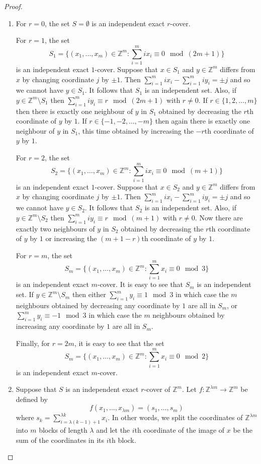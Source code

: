 \documentclass[12pt,a4paper]{article}
\newcommand{\Z}{\mathbb Z}
\begin{document}
\begin{proof}
\begin{enumerate}
\item For $r=0$, the set $S=\emptyset$ is an independent exact $r$-cover.

For $r=1$, the set 
\[
S_1=\{(x_1,\ldots,x_m)\in\Z^m : \sum_{i=1}^m ix_i\equiv 0 \mod (2m+1)\}
\]
is an independent exact $1$-cover. Suppose that $x\in S_1$ and $y\in\Z^m$ differs from $x$ by changing coordinate $j$ by $\pm1$. Then $\sum_{i=1}^m ix_i-\sum_{i=1}^m iy_i=\pm j$ and so we cannot have $y\in S_1$. It follows that $S_1$ is an independent set. Also, if $y\in \Z^m\setminus S_1$ then $\sum_{i=1}^m iy_i\equiv r \mod (2m+1)$ with $r\not=0$. If $r\in\{1,2,\ldots, m\}$ then there is exactly one neighbour of $y$ in $S_1$ obtained by decreasing the $r$th coordinate of $y$ by $1$. If $r\in\{-1,-2,\ldots, -m\}$ then again there is exactly one neighbour of $y$ in $S_1$, this time obtained by increasing the $-r$th coordinate of $y$ by $1$.

For $r=2$, the set 
\[
S_2=\{(x_1,\ldots,x_m)\in\Z^m : \sum_{i=1}^m ix_i\equiv 0 \mod (m+1)\}
\]
is an independent exact $1$-cover. Suppose that $x\in S_2$ and $y\in\Z^m$ differs from $x$ by changing coordinate $j$ by $\pm1$. Then $\sum_{i=1}^m ix_i-\sum_{i=1}^m iy_i=\pm j$ and so we cannot have $y\in S_2$. It follows that  $S_2$ is an independent set. Also, if $y\in \Z^m\setminus S_2$ then $\sum_{i=1}^m iy_i\equiv r \mod (m+1)$ with $r\not=0$. Now there are exactly two neighbours of $y$ in $S_2$ obtained by decreasing the $r$th coordinate of $y$ by $1$ or increasing the $(m+1-r)$th coordinate of $y$ by $1$.

For $r=m$, the set 
\[
S_m=\{(x_1,\ldots,x_m)\in\Z^m : \sum_{i=1}^m x_i\equiv 0 \mod 3\}
\]
is an independent exact $m$-cover. It is easy to see that $S_m$ is an independent set. If $y\in \Z^m\setminus S_m$ then either $\sum_{i=1}^m y_i\equiv 1 \mod 3$ in which case the $m$ neighbours obtained by decreasing any coordinate by $1$ are all in $S_m$, or $\sum_{i=1}^m y_i\equiv -1 \mod 3$ in which case the $m$ neighbours obtained by increasing any coordinate by $1$ are all in $S_m$.

Finally, for $r=2m$, it is easy to see that the set
\[
S_m=\{(x_1,\ldots,x_m)\in\Z^m : \sum_{i=1}^m x_i\equiv 0 \mod 2\}
\]
is an independent exact $m$-cover.
\item Suppose that $S$ is an independent exact $r$-cover of $\Z^m$. Let $f:\Z^{\lambda m}\rightarrow\Z^m$ be defined by
\[
f(x_1,\ldots,x_{\lambda m})=(s_1,\ldots,s_m)
\]
where $s_k=\sum_{i=\lambda(k-1)+1}^{\lambda k}x_i$. In other words, we split the coordinates of $\Z^{\lambda m}$ into $m$ blocks of length $\lambda$ and let the $i$th coordinate of the image of $x$ be the sum of the coordinates in its $i$th block.


\end{enumerate}
\end{proof}
\end{document}
